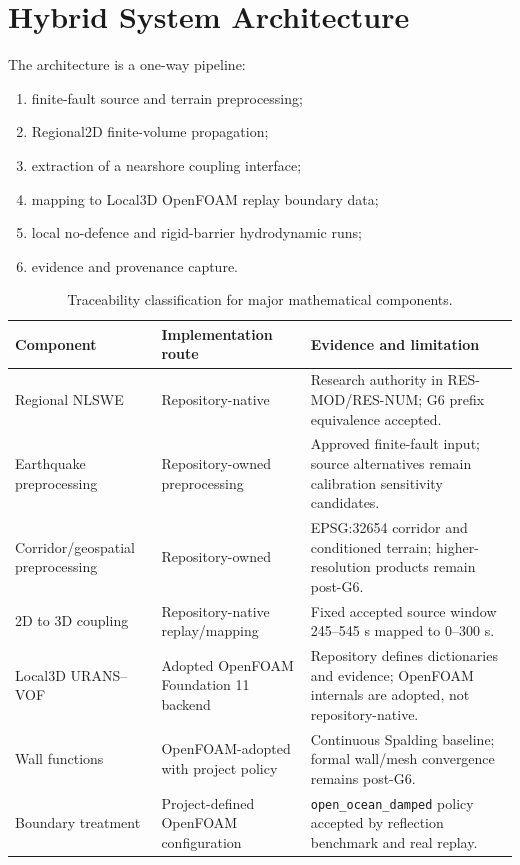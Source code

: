\section{Hybrid System Architecture}

The architecture is a one-way pipeline:

\begin{enumerate}
  \item finite-fault source and terrain preprocessing;
  \item Regional2D finite-volume propagation;
  \item extraction of a nearshore coupling interface;
  \item mapping to Local3D OpenFOAM replay boundary data;
  \item local no-defence and rigid-barrier hydrodynamic runs;
  \item evidence and provenance capture.
\end{enumerate}

\begin{table}[H]
\centering
\caption{Traceability classification for major mathematical components.}
\label{tab:traceability-classification}
\begin{tabularx}{\textwidth}{p{}p{}X}
\toprule
Component & Implementation route & Evidence and limitation \\
\midrule
Regional NLSWE & Repository-native & Research authority in RES-MOD/RES-NUM; G6 prefix equivalence accepted. \\
Earthquake preprocessing & Repository-owned preprocessing & Approved finite-fault input; source alternatives remain calibration sensitivity candidates. \\
Corridor/geospatial preprocessing & Repository-owned & EPSG:32654 corridor and conditioned terrain; higher-resolution products remain post-G6. \\
2D to 3D coupling & Repository-native replay/mapping & Fixed accepted source window 245--545 s mapped to 0--300 s. \\
Local3D URANS--VOF & Adopted OpenFOAM Foundation 11 backend & Repository defines dictionaries and evidence; OpenFOAM internals are adopted, not repository-native. \\
Wall functions & OpenFOAM-adopted with project policy & Continuous Spalding baseline; formal wall/mesh convergence remains post-G6. \\
Boundary treatment & Project-defined OpenFOAM configuration & \texttt{open\_ocean\_damped} policy accepted by reflection benchmark and real replay. \\
\bottomrule
\end{tabularx}
\end{table}
